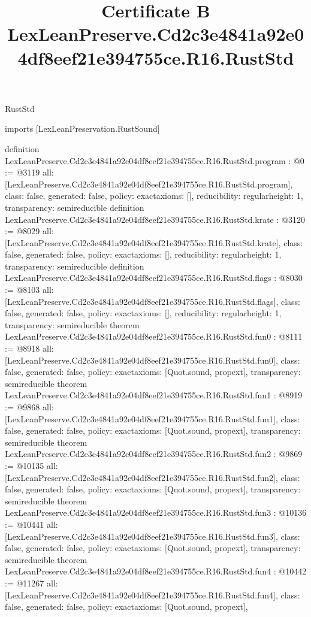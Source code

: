 \begin{lexlean}{RustStd}
\title{Certificate B LexLeanPreserve.Cd2c3e4841a92e04df8eef21e394755ce.R16.RustStd}
\begin{coremodule}
imports [LexLeanPreservation.RustSound]

definition LexLeanPreserve.Cd2c3e4841a92e04df8eef21e394755ce.R16.RustStd.program : @0 := @3119 {
  all: [LexLeanPreserve.Cd2c3e4841a92e04df8eef21e394755ce.R16.RustStd.program],
  class: false,
  generated: false,
  policy: exact{axioms: []},
  reducibility: regular{height: 1},
  transparency: semireducible
}
definition LexLeanPreserve.Cd2c3e4841a92e04df8eef21e394755ce.R16.RustStd.krate : @3120 := @8029 {
  all: [LexLeanPreserve.Cd2c3e4841a92e04df8eef21e394755ce.R16.RustStd.krate],
  class: false,
  generated: false,
  policy: exact{axioms: []},
  reducibility: regular{height: 1},
  transparency: semireducible
}
definition LexLeanPreserve.Cd2c3e4841a92e04df8eef21e394755ce.R16.RustStd.flags : @8030 := @8103 {
  all: [LexLeanPreserve.Cd2c3e4841a92e04df8eef21e394755ce.R16.RustStd.flags],
  class: false,
  generated: false,
  policy: exact{axioms: []},
  reducibility: regular{height: 1},
  transparency: semireducible
}
theorem LexLeanPreserve.Cd2c3e4841a92e04df8eef21e394755ce.R16.RustStd.fun0 : @8111 := @8918 {
  all: [LexLeanPreserve.Cd2c3e4841a92e04df8eef21e394755ce.R16.RustStd.fun0],
  class: false,
  generated: false,
  policy: exact{axioms: [Quot.sound, propext]},
  transparency: semireducible
}
theorem LexLeanPreserve.Cd2c3e4841a92e04df8eef21e394755ce.R16.RustStd.fun1 : @8919 := @9868 {
  all: [LexLeanPreserve.Cd2c3e4841a92e04df8eef21e394755ce.R16.RustStd.fun1],
  class: false,
  generated: false,
  policy: exact{axioms: [Quot.sound, propext]},
  transparency: semireducible
}
theorem LexLeanPreserve.Cd2c3e4841a92e04df8eef21e394755ce.R16.RustStd.fun2 : @9869 := @10135 {
  all: [LexLeanPreserve.Cd2c3e4841a92e04df8eef21e394755ce.R16.RustStd.fun2],
  class: false,
  generated: false,
  policy: exact{axioms: [Quot.sound, propext]},
  transparency: semireducible
}
theorem LexLeanPreserve.Cd2c3e4841a92e04df8eef21e394755ce.R16.RustStd.fun3 : @10136 := @10441 {
  all: [LexLeanPreserve.Cd2c3e4841a92e04df8eef21e394755ce.R16.RustStd.fun3],
  class: false,
  generated: false,
  policy: exact{axioms: [Quot.sound, propext]},
  transparency: semireducible
}
theorem LexLeanPreserve.Cd2c3e4841a92e04df8eef21e394755ce.R16.RustStd.fun4 : @10442 := @11267 {
  all: [LexLeanPreserve.Cd2c3e4841a92e04df8eef21e394755ce.R16.RustStd.fun4],
  class: false,
  generated: false,
  policy: exact{axioms: [Quot.sound, propext]},
}
\end{coremodule}
\end{lexlean}
